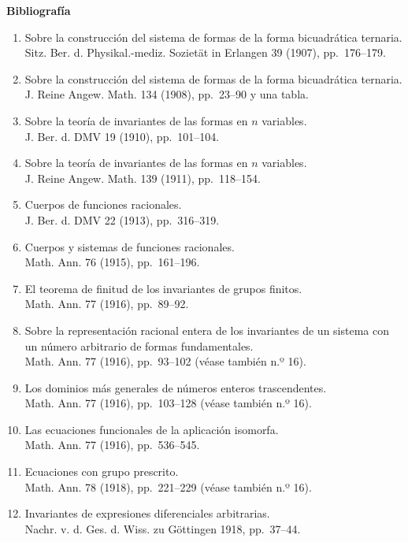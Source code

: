\clearpage
\begin{center}{\Large\bfseries Bibliografía}\end{center}
\label{bibliographie}

\begin{enumerate}
\setlength{\itemsep}{0.35em}
\item Sobre la construcción del sistema de formas de la forma bicuadrática ternaria.\\ Sitz. Ber. d. Physikal.-mediz. Sozietät in Erlangen 39 (1907), pp.~176--179.
\item Sobre la construcción del sistema de formas de la forma bicuadrática ternaria.\\ J. Reine Angew. Math. 134 (1908), pp.~23--90 y una tabla.
\item Sobre la teoría de invariantes de las formas en $n$ variables.\\ J. Ber. d. DMV 19 (1910), pp.~101--104.
\item Sobre la teoría de invariantes de las formas en $n$ variables.\\ J. Reine Angew. Math. 139 (1911), pp.~118--154.
\item Cuerpos de funciones racionales.\\ J. Ber. d. DMV 22 (1913), pp.~316--319.
\item Cuerpos y sistemas de funciones racionales.\\ Math. Ann. 76 (1915), pp.~161--196.
\item El teorema de finitud de los invariantes de grupos finitos.\\ Math. Ann. 77 (1916), pp.~89--92.
\item Sobre la representación racional entera de los invariantes de un sistema con un número arbitrario de formas fundamentales.\\ Math. Ann. 77 (1916), pp.~93--102 (véase también n.º 16).
\item Los dominios más generales de números enteros trascendentes.\\ Math. Ann. 77 (1916), pp.~103--128 (véase también n.º 16).
\item Las ecuaciones funcionales de la aplicación isomorfa.\\ Math. Ann. 77 (1916), pp.~536--545.
\item Ecuaciones con grupo prescrito.\\ Math. Ann. 78 (1918), pp.~221--229 (véase también n.º 16).
\item Invariantes de expresiones diferenciales arbitrarias.\\ Nachr. v. d. Ges. d. Wiss. zu Göttingen 1918, pp.~37--44.

\end{enumerate}
